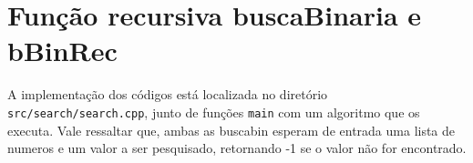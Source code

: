 \section{Função recursiva buscaBinaria e bBinRec}
A implementação dos códigos está localizada no diretório \texttt{src/search/search.cpp}, junto de funções \texttt{main} com um algoritmo que os executa. Vale ressaltar que, ambas as buscabin esperam de entrada uma lista de numeros e um valor a ser pesquisado, retornando -1 se o valor não for encontrado.


